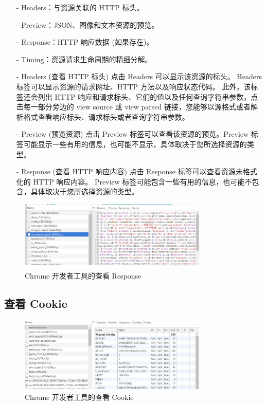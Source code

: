 \begin{itemize}
\item [-] Headers：与资源关联的 HTTP 标头。
\item [-] Preview：JSON、图像和文本资源的预览。
\item [-] Response：HTTP 响应数据 (如果存在)。
\item [-] Timing：资源请求生命周期的精细分解。
\item [-] Headers (查看 HTTP 标头) 点击 Headers 可以显示该资源的标头。 Headers 标签可以显示资源的请求网址、HTTP 方法以及响应状态代码。 此外，该标签还会列出 HTTP 响应和请求标头、它们的值以及任何查询字符串参数，点击每一部分旁边的 view source 或 view parsed 链接，您能够以源格式或者解析格式查看响应标头、请求标头或者查询字符串参数。
\item [-] Preview (预览资源) 点击 Preview 标签可以查看该资源的预览。Preview 标签可能显示一些有用的信息，也可能不显示，具体取决于您所选择资源的类型。
\item [-] Response (查看 HTTP 响应内容) 点击 Response 标签可以查看资源未格式化的 HTTP 响应内容。 Preview 标签可能包含一些有用的信息，也可能不包含，具体取决于您所选择资源的类型。
\end{itemize}

\begin{figure}[htb]
\centering 
\includegraphics[width=0.80\textwidth]{img/newch1m13.png} 
\caption{Chrome 开发者工具的查看 Response}
\label{Test}
\end{figure}

\subsection{查看 Cookie}

\begin{figure}[htb]
\centering 
\includegraphics[width=0.80\textwidth]{img/newch1m14.png} 
\caption{Chrome 开发者工具的查看 Cookie}
\label{Test}
\end{figure}

